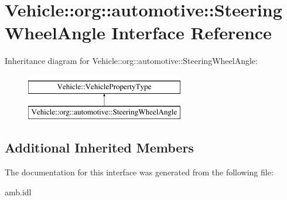 \hypertarget{interfaceVehicle_1_1org_1_1automotive_1_1SteeringWheelAngle}{\section{Vehicle\-:\-:org\-:\-:automotive\-:\-:Steering\-Wheel\-Angle Interface Reference}
\label{interfaceVehicle_1_1org_1_1automotive_1_1SteeringWheelAngle}
}
Inheritance diagram for Vehicle\-:\-:org\-:\-:automotive\-:\-:Steering\-Wheel\-Angle\-:\begin{figure}[H]
\begin{center}
\leavevmode
\includegraphics[height=2.000000cm]{interfaceVehicle_1_1org_1_1automotive_1_1SteeringWheelAngle}
\end{center}
\end{figure}
\subsection*{Additional Inherited Members}


The documentation for this interface was generated from the following file\-:\begin{DoxyCompactItemize}
\item 
amb.\-idl\end{DoxyCompactItemize}
